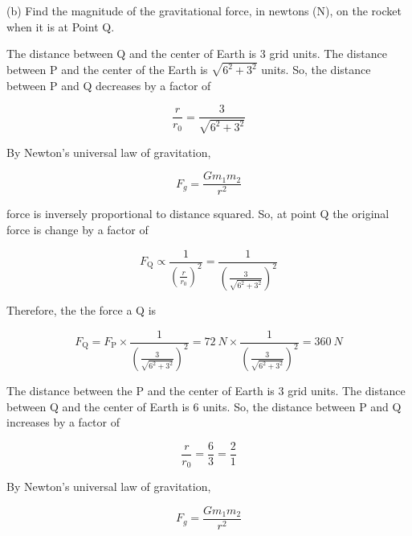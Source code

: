 \documentclass[answers]{exam}
\newif\ifversionKlevel
\begin{document}
\begin{questions}
(b) Find the magnitude of the gravitational force, in newtons (N), on the rocket when it is at Point Q.

\ifversionKlevel
    \begin{solutionorbox}[7cm]
    The distance between Q and the center of Earth is 3 grid units. The distance between P and the center of the Earth is $\sqrt{6^2 + 3^2}$ units. So, the distance between P and Q decreases by a factor of 
    
    \begin{equation*}
        \frac{r}{r_0} = \frac{3}{\sqrt{6^2 + 3^2}}
    \end{equation*}
    
    By Newton's universal law of gravitation,
    
    \begin{equation*}
        F_g = \frac{Gm_1 m_2}{r^2}
    \end{equation*}
    
    force is inversely proportional to distance squared. So, at point Q the original force is change by a factor of 
    
    \begin{equation*}
        F_\mathrm{Q} \propto \frac{1}{\left(\displaystyle \frac{r}{r_0}\right)^2} = \frac{1}{\left(\displaystyle \frac{3}{\sqrt{6^2 + 3^2}}\right)^2}
    \end{equation*}
    
    Therefore, the the force a Q is
    
    \begin{equation*}
        F_\mathrm{Q} = F_\mathrm{P} \times \frac{1}{\left(\displaystyle \frac{3}{\sqrt{6^2 + 3^2}}\right)^2} = \SI{72}{N} \times \frac{1}{\left(\displaystyle \frac{3}{\sqrt{6^2 + 3^2}}\right)^2} = \boxed{\SI{360}{N}}
    \end{equation*}
    \end{solutionorbox}
\else
    \begin{solutionorbox}[10cm]
    The distance between the P and the center of Earth is 3 grid units. The distance between Q and the center of Earth is 6 units. So, the distance between P and Q increases by a factor of 
    
    \begin{equation*}
        \frac{r}{r_0} = \frac{6}{3} = \frac{2}{1}
    \end{equation*}
    
    By Newton's universal law of gravitation,
    
    \begin{equation*}
        F_g = \frac{Gm_1 m_2}{r^2}
    \end{equation*}
    

\end{solutionorbox}
\end{questions}
\end{document}
